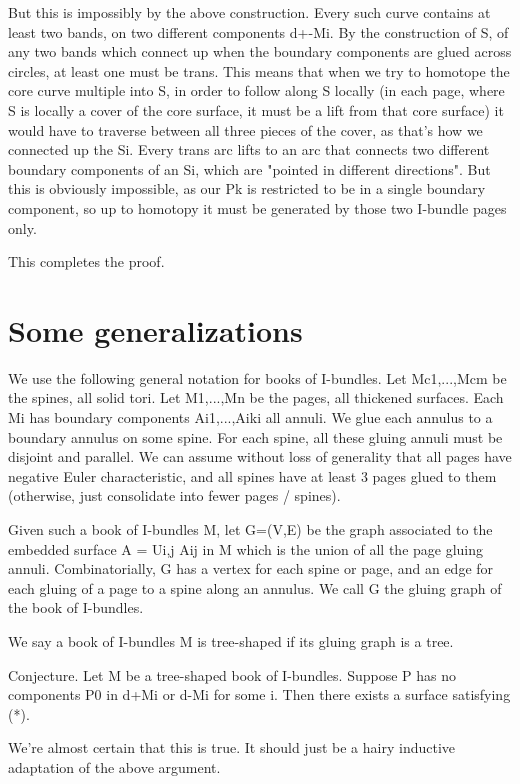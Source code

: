\documentclass[12pt]{amsart}
\theoremstyle{definition}
\begin{document}
But this is impossibly by the above construction. Every such curve contains at
least two bands, on two different components d+-Mi. By the construction of S,
of any two bands which connect up when the boundary components are glued across
circles, at least one must be trans. This means that when we try to homotope
the core curve multiple into S, in order to follow along S locally (in each
page, where S is locally a cover of the core surface, it must be a lift from
that core surface) it would have to traverse between all three pieces of the
cover, as that's how we connected up the Si. Every trans arc lifts to an arc
that connects two different boundary components of an Si, which are "pointed in
different directions". But this is obviously impossible, as our Pk is
restricted to be in a single boundary component, so up to homotopy it must be
generated by those two I-bundle pages only.

This completes the proof.

\section{Some generalizations}

We use the following general notation for books of I-bundles. Let Mc1,...,Mcm
be the spines, all solid tori. Let M1,...,Mn be the pages, all thickened
surfaces. Each Mi has boundary components Ai1,...,Aiki all annuli. We glue each
annulus to a boundary annulus on some spine. For each spine, all these gluing
annuli must be disjoint and parallel. We can assume without loss of generality
that all pages have negative Euler characteristic, and all spines have at least
3 pages glued to them (otherwise, just consolidate into fewer pages / spines).

Given such a book of I-bundles M, let G=(V,E) be the graph associated to the
embedded surface A = Ui,j Aij in M which is the union of all the page gluing
annuli. Combinatorially, G has a vertex for each spine or page, and an edge for
each gluing of a page to a spine along an annulus. We call G the gluing graph
of the book of I-bundles.

We say a book of I-bundles M is tree-shaped if its gluing graph is a tree.

Conjecture. Let M be a tree-shaped book of I-bundles. Suppose P has no
components P0 in d+Mi or d-Mi for some i. Then there exists a surface
satisfying (*).

We're almost certain that this is true. It should just be a hairy inductive
adaptation of the above argument.
\end{document}
